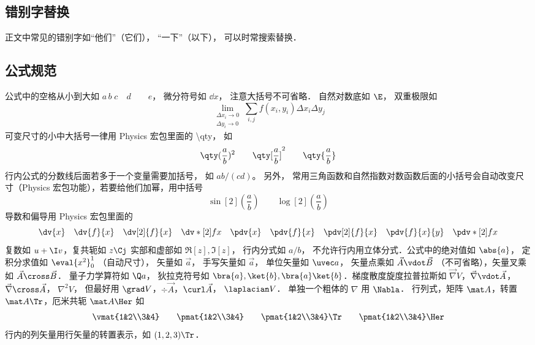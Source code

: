 \subsection{错别字替换}
正文中常见的错别字如“他们”（它们）， “一下”（以下）， 可以时常搜索替换．

\subsection{公式规范}
公式中的空格从小到大如 $a\, b\; c\quad d\qquad e$， 微分符号如 $\dd{x}$， 注意大括号不可省略． 自然对数底如 $\E$， 双重极限如
\begin{equation}
\lim_{\substack{\Delta x_i\to 0\\ \Delta y_i\to 0}} \sum_{i, j} f(x_i,y_i) \Delta x_i \Delta y_j
\end{equation}
可变尺寸的小中大括号一律用 Physics 宏包里面的 \textbackslash qty， 如
\begin{equation}
\qty(\frac ab)^2 \qquad \qty[\frac ab]^2 \qquad \qty{ \frac ab}
\end{equation}
行内公式的分数线后面若多于一个变量需要加括号， 如 $ab/(cd)$。 另外， 常用三角函数和自然指数对数函数后面的小括号会自动改变尺寸（Physics 宏包功能），若要给他们加幂，用中括号
\begin{equation}
\sin[2](\frac ab) \qquad \log[2](\frac ab)
\end{equation}
导数和偏导用 Physics 宏包里面的
\begin{equation}
\dv{x} \quad \dv{f}{x} \quad \dv[2]{f}{x} \quad \dv*[2]{f}{x} \quad
\pdv{x} \quad \pdv{f}{x} \quad \pdv[2]{f}{x} \quad \pdv{f}{x}{y} \quad \pdv*[2]{f}{x}
\end{equation}
复数如 $u+\I v$，复共轭如 $z\Cj$ 实部和虚部如 $\Re[z], \Im[z]$，  行内分式如 $a/b$， 不允许行内用立体分式．公式中的绝对值如 $\abs{a}$， 定积分求值如 $\eval{x^2}_0^1$ （自动尺寸）， 矢量如 $\vec a$， 手写矢量如 $\overrightarrow{a}$， 单位矢量如 $\uvec a$， 矢量点乘如 $\vec A \vdot \vec B$ （不可省略），矢量叉乘如 $\vec A\cross\vec B$． 量子力学算符如 $\Q a$， 狄拉克符号如 $\bra{a}, \ket{b}, \bra{a}\ket{b}$．梯度散度旋度拉普拉斯如 $\vec\nabla V$，$\vec\nabla\vdot\vec A$，$\vec\nabla\cross\vec A$，  $\nabla^2 V$， 但最好用 $\grad V$，$\div\vec A$，$\curl\vec A$，  $\laplacian V$． 单独一个粗体的 $\nabla$ 用 $\Nabla$． 行列式，矩阵 $\mat A$，转置 $\mat A \Tr$，厄米共轭 $\mat A \Her$ 如
\begin{equation}
\vmat{1&2\\3&4} \qquad 
\pmat{1&2\\3&4} \qquad 
\pmat{1&2\\3&4}\Tr \qquad
\pmat{1&2\\3&4}\Her
\end{equation}
行内的列矢量用行矢量的转置表示，如 $(1,2,3)\Tr$． 



